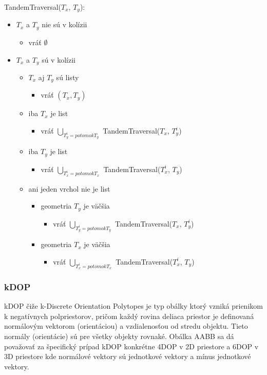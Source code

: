 \documentclass[a4paper]{article}
\begin{document}
	TandemTraversal($T_x$, $T_y$):
	\begin{itemize}
		\item $T_x$ a $T_y$ nie sú v kolízii
		\begin{itemize}
			\item vráť $ \emptyset $ 
		\end{itemize}
		\item $T_x$ a $T_y$ sú v kolízii
		\begin{itemize}
			\item $T_x$ aj $T_y$ sú listy
			\begin{itemize}
				\item vráť $\left(T_x, T_y\right)$
			\end{itemize} 
			\item iba $T_x$ je list
			\begin{itemize}
				\item vráť $\bigcup\limits_{T_y^i = potomok T_y}$ TandemTraversal($T_x$, $T_y^i$)
			\end{itemize} 
			\item iba $T_y$ je list
			\begin{itemize}
				\item vráť $\bigcup\limits_{T_x^i = potomok T_x}$ TandemTraversal($T_x^i$, $T_y$)
			\end{itemize} 
			\item ani jeden vrchol nie je list
			\begin{itemize}
				\item geometria $T_y$ je väčšia
				\begin{itemize}
					\item vráť $\bigcup\limits_{T_y^i = potomok T_y}$ TandemTraversal($T_x$, $T_y^i$)
				\end{itemize} 
				\item geometria $T_x$ je väčšia
				\begin{itemize}
					\item vráť $\bigcup\limits_{T_x^i = potomok T_x}$ TandemTraversal($T_x^i$, $T_y$)
				\end{itemize} 
			\end{itemize}
		\end{itemize}
	\end{itemize}

	\subsubsection{kDOP}
	
	kDOP čiže k-Discrete Orientation Polytopes je typ obálky ktorý vzniká prienikom k negatívnych polpriestorov, pričom každý rovina deliaca priestor je definovaná normálovým vektorom (orientáciou) a vzdialenosťou od stredu objektu. Tieto normály (orientácie) sú pre všetky objekty rovnaké. Obálka AABB sa dá považovať za špecifický prípad kDOP konkrétne 4DOP v 2D priestore a 6DOP v 3D priestore kde normálové vektory sú jednotkové vektory a mínus jednotkové vektory. 
	\\
	
\end{document}
